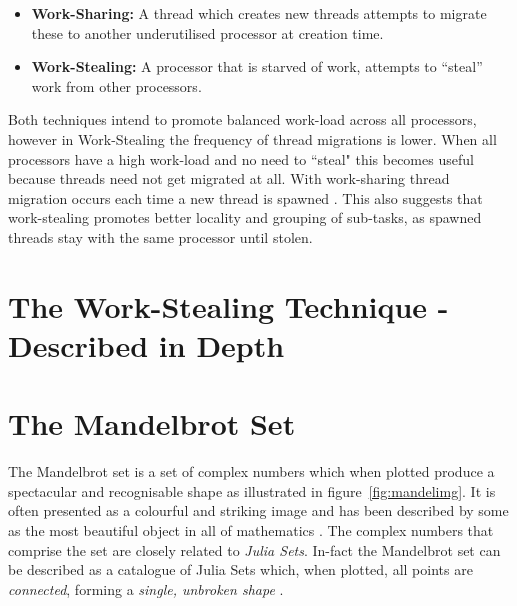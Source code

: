 \begin{itemize}
\item \textbf{Work-Sharing:} A thread which creates new threads attempts to migrate these to another underutilised processor at creation time. 
\item \textbf{Work-Stealing:} A processor that is starved of work, attempts to ``steal'' work from other processors. 
\end{itemize}

Both techniques intend to promote balanced work-load across all processors, however in Work-Stealing
the frequency of thread migrations is lower. When all processors have a 
high work-load and no need to ``steal" this becomes useful because threads need not get 
migrated at all. With work-sharing thread migration occurs each time a new thread is spawned \cite[p.~2]{blumleis}.
This also suggests that work-stealing promotes better locality and grouping of sub-tasks, as spawned threads stay with the same 
processor until stolen.



\section{The Work-Stealing Technique - Described in Depth}


\section{The Mandelbrot Set}

The Mandelbrot set is a set of complex numbers which when plotted produce a spectacular and recognisable shape as illustrated in figure~\ref{fig:mandelimg}.
It is often presented as a colourful and striking image and has been described by some as the most beautiful object in all of mathematics \cite[p.~234]{chaosfract}.
The complex numbers that comprise the set are closely related to \textit{Julia Sets}. 
In-fact the Mandelbrot set can be described as a catalogue of Julia Sets which, when plotted, all points are \textit{connected}, 
forming a \textit{single, unbroken shape} \cite[p.~177]{fractimg}.

